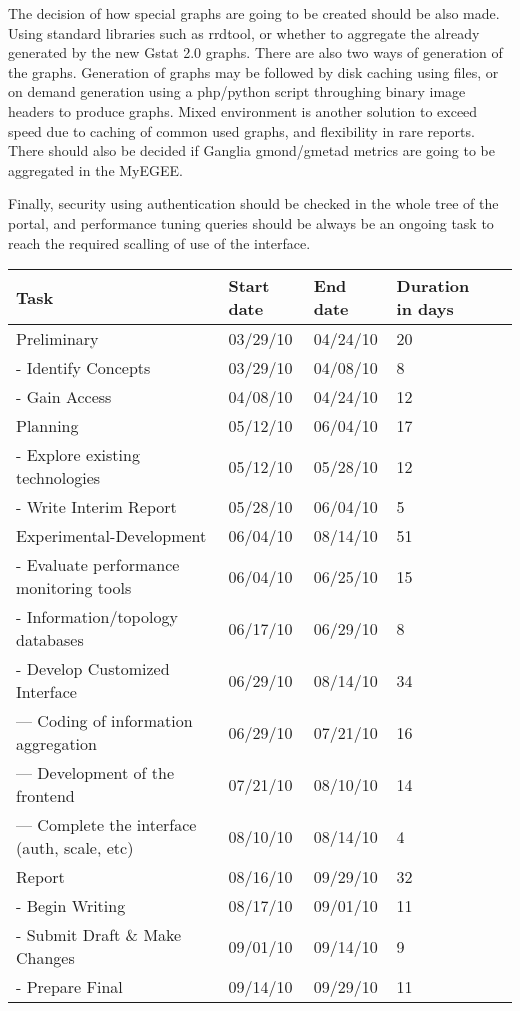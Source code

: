 The decision of how special graphs are going to be
created should be also made. Using standard libraries such as rrdtool, or
whether to aggregate the already generated by the new Gstat 2.0 graphs.
There are also two ways of generation of the graphs. Generation of graphs may be
followed by disk caching using files, or on demand generation using a php/python
script throughing binary image headers to produce graphs. Mixed environment is
another solution to exceed speed due to caching of common used graphs, and
flexibility in rare reports. There should also be decided if Ganglia
gmond/gmetad metrics are going to be aggregated in the MyEGEE. 

Finally, security
using authentication should be checked in the whole tree of the portal, and
performance tuning queries should be always be an ongoing task to reach the
required scalling of use of the interface.

\begin{table}[ht]
\begin{tabular}{ | l | l | l | l | r |}    
\hline
Task & Start date & End date & Duration in days \\ \hline
  Preliminary & 03/29/10 & 04/24/10 & 20 \\ \hline 
  -  Identify Concepts & 03/29/10 & 04/08/10 & 8 \\ \hline 
  -  Gain Access & 04/08/10 & 04/24/10 & 12 \\ \hline 
  Planning & 05/12/10 & 06/04/10 & 17 \\ \hline 
  -  Explore existing technologies & 05/12/10 & 05/28/10 & 12 \\ \hline 
  -  Write Interim Report & 05/28/10 & 06/04/10 & 5 \\ \hline 
  Experimental-Development & 06/04/10 & 08/14/10 & 51 \\ \hline 
  -  Evaluate performance monitoring tools & 06/04/10 & 06/25/10 & 15 \\ \hline 
  -  Information/topology databases & 06/17/10 & 06/29/10 & 8 \\ \hline 
  -  Develop Customized Interface & 06/29/10 & 08/14/10 & 34 \\ \hline 
  ---    Coding of information aggregation & 06/29/10 & 07/21/10 & 16 \\ \hline 
  ---    Development of the frontend & 07/21/10 & 08/10/10 & 14 \\ \hline 
  ---    Complete the interface (auth, scale, etc) & 08/10/10 & 08/14/10 & 4 \\
      \hline Report & 08/16/10 & 09/29/10 & 32 \\ \hline 
  -  Begin Writing & 08/17/10 & 09/01/10 & 11 \\ \hline 
  -  Submit Draft \& Make Changes & 09/01/10 & 09/14/10 & 9 \\ \hline 
  -  Prepare Final & 09/14/10 & 09/29/10 & 11 \\ \hline 
\end{tabular}
\label{tab:tasks}
\end{table}


